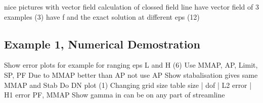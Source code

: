 \documentclass[12pt,a4paper]{article}
\begin{document}
\begin{table}[]
\end{table}


nice pictures with vector field
calculation of clossed field line
have vector field of 3 examples (3)
have f and the exact solution at different eps (12)

\subsection{Example 1, Numerical Demostration}
Show error plots for example for ranging eps  L and H (6)
Use MMAP, AP, Limit, SP, PF
Due to MMAP better than AP not use AP
Show stabalisation gives same MMAP and Stab
Do DN plot (1)
Changing grid size table 
size | dof | L2 error | H1 error PF, MMAP
Show gamma in can be on any part of streamline
\end{document}
